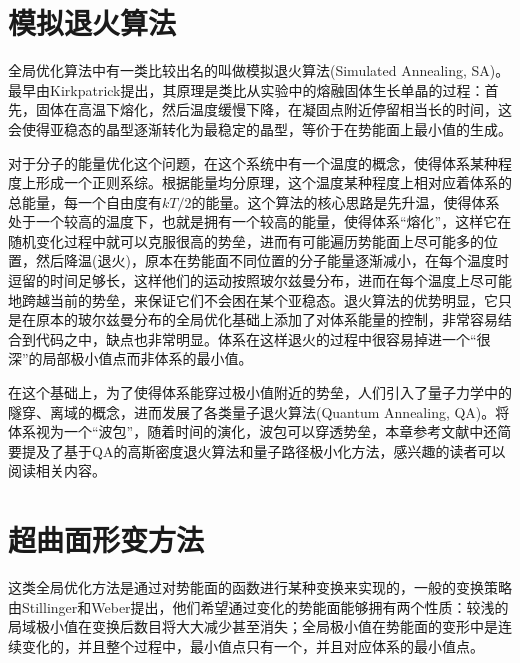\documentclass[12pt,a4paper,openany,twoside]{book}
\numberwithin{equation}{section}
\begin{document}
      \section{模拟退火算法}
        全局优化算法中有一类比较出名的叫做模拟退火算法(Simulated Annealing, SA)。最早由Kirkpatrick提出，其原理是类比从实验中的熔融固体生长单晶的过程：首先，固体在高温下熔化，然后温度缓慢下降，在凝固点附近停留相当长的时间，这会使得亚稳态的晶型逐渐转化为最稳定的晶型，等价于在势能面上最小值的生成。
        
        对于分子的能量优化这个问题，在这个系统中有一个温度的概念，使得体系某种程度上形成一个正则系综。根据能量均分原理，这个温度某种程度上相对应着体系的总能量，每一个自由度有$kT/2$的能量。这个算法的核心思路是先升温，使得体系处于一个较高的温度下，也就是拥有一个较高的能量，使得体系“熔化”，这样它在随机变化过程中就可以克服很高的势垒，进而有可能遍历势能面上尽可能多的位置，然后降温(退火)，原本在势能面不同位置的分子能量逐渐减小，在每个温度时逗留的时间足够长，这样他们的运动按照玻尔兹曼分布，进而在每个温度上尽可能地跨越当前的势垒，来保证它们不会困在某个亚稳态。退火算法的优势明显，它只是在原本的玻尔兹曼分布的全局优化基础上添加了对体系能量的控制，非常容易结合到代码之中，缺点也非常明显。体系在这样退火的过程中很容易掉进一个“很深”的局部极小值点而非体系的最小值。

        在这个基础上，为了使得体系能穿过极小值附近的势垒，人们引入了量子力学中的隧穿、离域的概念，进而发展了各类量子退火算法(Quantum Annealing, QA)。将体系视为一个“波包”，随着时间的演化，波包可以穿透势垒，本章参考文献中还简要提及了基于QA的高斯密度退火算法和量子路径极小化方法，感兴趣的读者可以阅读相关内容。
      \section{超曲面形变方法}
        这类全局优化方法是通过对势能面的函数进行某种变换来实现的，一般的变换策略由Stillinger和Weber提出，他们希望通过变化的势能面能够拥有两个性质：较浅的局域极小值在变换后数目将大大减少甚至消失；全局极小值在势能面的变形中是连续变化的，并且整个过程中，最小值点只有一个，并且对应体系的最小值点。
\end{document}
